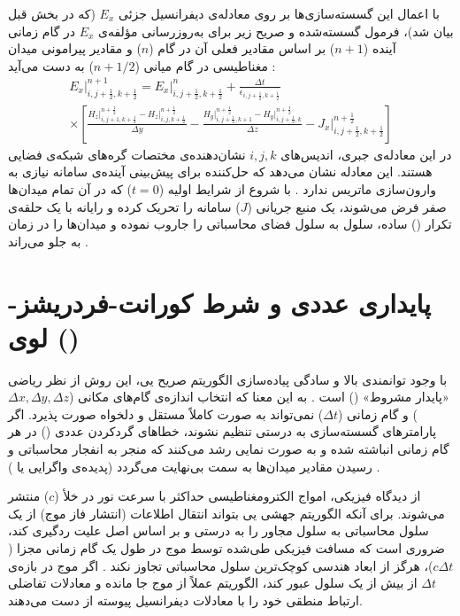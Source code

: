\documentclass[12pt,a4paper]{report}
\begin{document}
با اعمال این گسسته‌سازی‌ها بر روی معادله‌ی دیفرانسیل جزئی $E_x$ (که در بخش قبل بیان شد)، فرمول گسسته‌شده و صریح زیر برای به‌روزرسانی مؤلفه‌ی $E_x$ در گام زمانی آینده ($n+1$) بر اساس مقادیر فعلی آن در گام ($n$) و مقادیر پیرامونی میدان مغناطیسی در گام میانی ($n+1/2$) به دست می‌آید \cite{taflove}:
\begin{multline}
E_x\big|^{n+1}_{i,j+\frac12,k+\frac12}=E_x\big|^{n}_{i,j+\frac12,k+\frac12}+\frac{\Delta t}{\epsilon_{i,j+\frac12,k+\frac12}}\\
\times\left[\frac{H_z\big|^{n+\frac12}_{i,j+1,k+\frac12}-H_z\big|^{n+\frac12}_{i,j,k+\frac12}}{\Delta y}-\frac{H_y\big|^{n+\frac12}_{i,j+\frac12,k+1}-H_y\big|^{n+\frac12}_{i,j+\frac12,k}}{\Delta z}-J_x\big|^{n+\frac12}_{i,j+\frac12,k+\frac12}\right]
\end{multline}
در این معادله‌ی جبری، اندیس‌های $i,j,k$ نشان‌دهنده‌ی مختصات گره‌های شبکه‌ی فضایی هستند. این معادله نشان می‌دهد که حل‌کننده  برای پیش‌بینی آینده‌ی سامانه نیازی به وارون‌سازی ماتریس ندارد \cite{taflove}. با شروع از شرایط اولیه ($t=0$) که در آن تمام میدان‌ها صفر فرض می‌شوند، یک منبع جریانی ($J$) سامانه را تحریک کرده و رایانه با یک حلقه‌ی تکرار () ساده، سلول به سلول فضای محاسباتی را جاروب نموده و میدان‌ها را در زمان به جلو می‌راند \cite{taflove}.

\section{پایداری عددی و شرط کورانت-فردریشز-لوی ()}
با وجود توانمندی بالا و سادگی پیاده‌سازی الگوریتم صریح یی، این روش از نظر ریاضی «پایدار مشروط» () است \cite{taflove}. به این معنا که انتخاب اندازه‌ی گام‌های مکانی ($\Delta x,\Delta y,\Delta z$) و گام زمانی ($\Delta t$) نمی‌تواند به صورت کاملاً مستقل و دلخواه صورت پذیرد. اگر پارامترهای گسسته‌سازی به درستی تنظیم نشوند، خطاهای گردکردن عددی () در هر گام زمانی انباشته شده و به صورت نمایی رشد می‌کنند که منجر به انفجار محاسباتی و رسیدن مقادیر میدان‌ها به سمت بی‌نهایت می‌گردد (پدیده‌ی واگرایی یا ) \cite{taflove}.

از دیدگاه فیزیکی، امواج الکترومغناطیسی حداکثر با سرعت نور در خلأ ($c$) منتشر می‌شوند. برای آنکه الگوریتم جهشی یی بتواند انتقال اطلاعات (انتشار فاز موج) از یک سلول محاسباتی به سلول مجاور را به درستی و بر اساس اصل علیت ردگیری کند، ضروری است که مسافت فیزیکی طی‌شده توسط موج در طول یک گام زمانی مجزا ($c\Delta t$)، هرگز از ابعاد هندسی کوچک‌ترین سلول محاسباتی تجاوز نکند \cite{taflove}. اگر موج در بازه‌ی $\Delta t$ از بیش از یک سلول عبور کند، الگوریتم عملاً از موج جا مانده و معادلات تفاضلی ارتباط منطقی خود را با معادلات دیفرانسیل پیوسته از دست می‌دهند.
\end{document}
